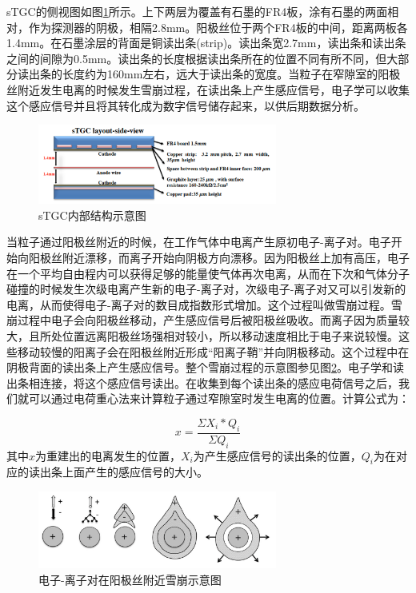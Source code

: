 sTGC的侧视图如图\ref{fig:sTGC_sideview}所示。上下两层为覆盖有石墨的FR4板，涂有石墨的两面相对，作为探测器的阴极，相隔2.8mm。阳极丝位于两个FR4板的中间，距离两板各1.4mm。在石墨涂层的背面是铜读出条(strip)。读出条宽2.7mm，读出条和读出条之间的间隙为0.5mm。读出条的长度根据读出条所在的位置不同有所不同，但大部分读出条的长度约为160mm左右，远大于读出条的宽度。当粒子在窄隙室的阳极丝附近发生电离的时候发生雪崩过程，在读出条上产生感应信号，电子学可以收集这个感应信号并且将其转化成为数字信号储存起来，以供后期数据分析。
\begin{figure}[htb]
    \begin{center}
    \includegraphics[width=0.7\textwidth,clip]{figures/Chapter3/sTGC_side_view.png}
    \end{center}
    \caption[sTGC内部结构示意图]{sTGC内部结构示意图}
    \label{fig:sTGC_sideview}
\end{figure}

当粒子通过阳极丝附近的时候，在工作气体中电离产生原初电子-离子对。电子开始向阳极丝附近漂移，而离子开始向阴极方向漂移。因为阳极丝上加有高压，电子在一个平均自由程内可以获得足够的能量使气体再次电离，从而在下次和气体分子碰撞的时候发生次级电离产生新的电子-离子对，次级电子-离子对又可以引发新的电离，从而使得电子-离子对的数目成指数形式增加。这个过程叫做雪崩过程。雪崩过程中电子会向阳极丝移动，产生感应信号后被阳极丝吸收。而离子因为质量较大，且所处位置远离阳极丝场强相对较小，所以移动速度相比于电子来说较慢。这些移动较慢的阳离子会在阳极丝附近形成“阳离子鞘”并向阴极移动。这个过程中在阴极背面的读出条上产生感应信号。整个雪崩过程的示意图参见图\ref{fig:Avalanche}。电子学和读出条相连接，将这个感应信号读出。在收集到每个读出条的感应电荷信号之后，我们就可以通过电荷重心法来计算粒子通过窄隙室时发生电离的位置。计算公式为：

\begin{equation}
    \label{eq:center_of_gravity}
    x = \frac{\Sigma X_i*Q_i}{\Sigma Q_i} 
\end{equation}
其中$x$为重建出的电离发生的位置，$X_i$为产生感应信号的读出条的位置，$Q_i$为在对应的读出条上面产生的感应信号的大小。

\begin{figure}[htb]
    \begin{center}
    \includegraphics[width=0.7\textwidth,clip]{figures/Chapter3/Avalanche.png}
    \end{center}
    \caption[电子-离子对在阳极丝附近雪崩示意图]{电子-离子对在阳极丝附近雪崩示意图}
    \label{fig:Avalanche}
\end{figure}

